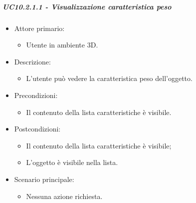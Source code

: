 \subparagraph{UC10.2.1.1 - Visualizzazione caratteristica peso}
\begin{itemize}

	\item Attore primario: 
	\begin{itemize}
		\item Utente in ambiente 3D.
	\end{itemize}
	\item Descrizione:
	\begin{itemize}
		\item L'utente può vedere la caratteristica peso dell'oggetto.
	\end{itemize}
	
	\item Precondizioni:
	\begin{itemize}
		\item Il contenuto della lista caratteristiche è visibile.
	\end{itemize}
	
	\item Postcondizioni:
	\begin{itemize}
		\item Il contenuto della lista caratteristiche è visibile;
		\item L'oggetto è visibile nella lista.
	\end{itemize}
	
	\item Scenario principale:
	\begin{itemize}
		\item Nessuna azione richiesta.
	\end{itemize}
	
\end{itemize}

